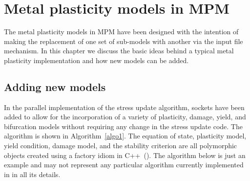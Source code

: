 \chapter{Metal plasticity models in MPM}
The metal plasticity models in MPM have been designed with the intention of
making the replacement of one set of sub-models with another via the input
file mechanism. In this chapter we discuss the basic ideas behind a typical
metal plasticity implementation and how new models can be added.

\section{Adding new models}
  In the parallel implementation of the stress update algorithm, sockets have 
  been added to allow for the incorporation of a variety of plasticity, damage, 
  yield, and bifurcation models without requiring any change in the stress 
  update code.  The algorithm is shown in Algorithm~\ref{algo1}.  The
  equation of state, plasticity model, yield condition, damage model, and
  the stability criterion are all polymorphic objects created using a 
  factory idiom in C++~(\cite{Coplien1992}).  The algorithm below is just
  an example and may not represent any particular algorithm currently
  implemented in \Vaango in all its details.
